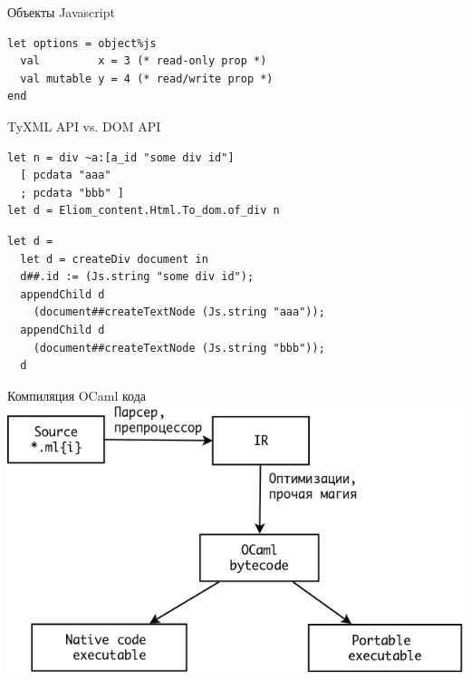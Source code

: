 \documentclass{beamer}
\theoremstyle{definition}
\begin{document}
\begin{frame}[fragile]{Объекты Javascript}
\pause
\begin{verbatim}
let options = object%js
  val         x = 3 (* read-only prop *)
  val mutable y = 4 (* read/write prop *)
end
\end{verbatim}
\end{frame}

\begin{frame}[fragile]{TyXML API vs. DOM API}
\begin{verbatim}
let n = div ~a:[a_id "some div id"]
  [ pcdata "aaa"
  ; pcdata "bbb" ]
let d = Eliom_content.Html.To_dom.of_div n
\end{verbatim}
\pause \vskip5mm \vskip10mm
\begin{verbatim}
let d =
  let d = createDiv document in  
  d##.id := (Js.string "some div id");
  appendChild d 
    (document##createTextNode (Js.string "aaa"));
  appendChild d 
    (document##createTextNode (Js.string "bbb"));
  d
\end{verbatim}
\end{frame}


\begin{frame}[fragile]{Компиляция OCaml кода}
\includegraphics[width=1\textwidth]{compilation1.png}
\end{frame}
\end{document}
